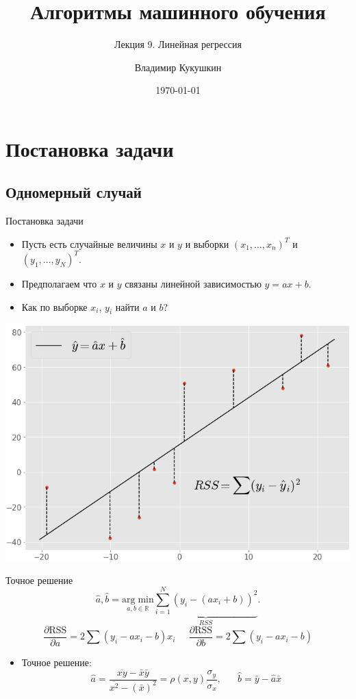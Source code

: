 \documentclass[9pt]{beamer}
\title{Алгоритмы машинного обучения}
\subtitle{Лекция 9. Линейная регрессия}
\author{Владимир Кукушкин}
\institute{СПбГЭУ - 2020}
\date{\today}
\begin{document}
\section{Постановка задачи}
\subsection{Одномерный случай}

\begin{frame}{Постановка задачи}
\begin{itemize}
    \item Пусть есть случайные величины $x$ и $y$ и выборки $(x_1, \ldots, x_n)^T$ и $(y_1, \ldots, y_N)^T$. 
    \item Предполагаем что $x$ и $y$ связаны линейной зависимостью $y=ax+b$.
    \item Как по выборке $x_i$, $y_i$ найти $a$ и $b$?
\end{itemize}
\begin{center}
    \includegraphics[height=0.5\textheight]{img/linear_regression_2d.png}
\end{center}
\end{frame}

\begin{frame}{Точное решение}
    $$\hat a, \hat b = \underset{a, b\in \mathbb{R}}{\mathrm{arg\;min}}\underbrace{\sum_{i=1}^N (y_i - (ax_i + b))^2}_{RSS}.$$
    $$\frac{\partial \text{RSS}}{\partial a} = 2\sum (y_i - ax_i - b)x_i\;\;\;\;\;\frac{\partial \text{RSS}}{\partial b} = 2\sum (y_i - ax_i - b)$$
\begin{itemize}
    \item Точное решение:
    $$\hat a = \frac{\overline{xy} - \bar x\bar y}{\overline{x^2} - (\bar x)^2} = \rho(x, y)\frac{\sigma_y}{\sigma_x} , \;\;\;\;\;\; \hat b = \bar y - \hat a \bar x$$
\end{itemize}
\end{frame}
\end{document}
